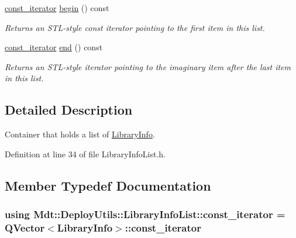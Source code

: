 \begin{DoxyCompactItemize}
\hyperlink{class_mdt_1_1_deploy_utils_1_1_library_info_list_a07338b20f243a1c7fcb3f696a35ddd44}{const\+\_\+iterator} \hyperlink{class_mdt_1_1_deploy_utils_1_1_library_info_list_a8615c525532a7f1dd3ae5cea7b7ff738}{begin} () const 
\begin{DoxyCompactList}\small\item\em Returns an S\+T\+L-\/style const iterator pointing to the first item in this list. \end{DoxyCompactList}\item 
\hyperlink{class_mdt_1_1_deploy_utils_1_1_library_info_list_a07338b20f243a1c7fcb3f696a35ddd44}{const\+\_\+iterator} \hyperlink{class_mdt_1_1_deploy_utils_1_1_library_info_list_ac634a5731ec5fd1b0a4fef46bb5c194a}{end} () const 
\begin{DoxyCompactList}\small\item\em Returns an S\+T\+L-\/style iterator pointing to the imaginary item after the last item in this list. \end{DoxyCompactList}\end{DoxyCompactItemize}


\subsection{Detailed Description}
Container that holds a list of \hyperlink{class_mdt_1_1_deploy_utils_1_1_library_info}{Library\+Info}. 

Definition at line 34 of file Library\+Info\+List.\+h.



\subsection{Member Typedef Documentation}
\subsubsection[{\texorpdfstring{const\+\_\+iterator}{const_iterator}}]{\setlength{\rightskip}{0pt plus 5cm}using {\bf Mdt\+::\+Deploy\+Utils\+::\+Library\+Info\+List\+::const\+\_\+iterator} =  Q\+Vector$<${\bf Library\+Info}$>$\+::{\bf const\+\_\+iterator}}\hypertarget{class_mdt_1_1_deploy_utils_1_1_library_info_list_a07338b20f243a1c7fcb3f696a35ddd44}{}\label{class_mdt_1_1_deploy_utils_1_1_library_info_list_a07338b20f243a1c7fcb3f696a35ddd44}


